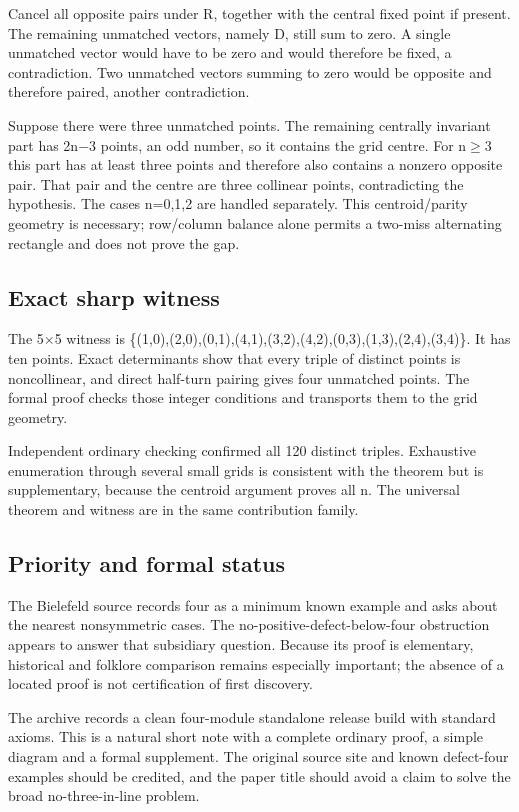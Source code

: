 \documentclass[11pt,a4paper]{article}
\begin{document}
Cancel all opposite pairs under R, together with the central fixed point if present. The remaining unmatched vectors, namely D, still sum to zero. A single unmatched vector would have to be zero and would therefore be fixed, a contradiction. Two unmatched vectors summing to zero would be opposite and therefore paired, another contradiction.

Suppose there were three unmatched points. The remaining centrally invariant part has 2n\ensuremath{-}3 points, an odd number, so it contains the grid centre. For n\ensuremath{\geq}3 this part has at least three points and therefore also contains a nonzero opposite pair. That pair and the centre are three collinear points, contradicting the hypothesis. The cases n=0,1,2 are handled separately. This centroid/parity geometry is necessary; row/column balance alone permits a two-miss alternating rectangle and does not prove the gap.

\subsection{Exact sharp witness}
The 5\ensuremath{\times}5 witness is \{(1,0),(2,0),(0,1),(4,1),(3,2),(4,2),(0,3),(1,3),(2,4),(3,4)\}. It has ten points. Exact determinants show that every triple of distinct points is noncollinear, and direct half-turn pairing gives four unmatched points. The formal proof checks those integer conditions and transports them to the grid geometry.

Independent ordinary checking confirmed all 120 distinct triples. Exhaustive enumeration through several small grids is consistent with the theorem but is supplementary, because the centroid argument proves all n. The universal theorem and witness are in the same contribution family.

\subsection{Priority and formal status}
The Bielefeld source records four as a minimum known example and asks about the nearest nonsymmetric cases. The no-positive-defect-below-four obstruction appears to answer that subsidiary question. Because its proof is elementary, historical and folklore comparison remains especially important; the absence of a located proof is not certification of first discovery.

The archive records a clean four-module standalone release build with standard axioms. This is a natural short note with a complete ordinary proof, a simple diagram and a formal supplement. The original source site and known defect-four examples should be credited, and the paper title should avoid a claim to solve the broad no-three-in-line problem.
\end{document}
